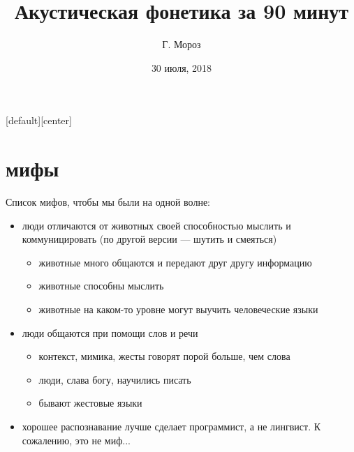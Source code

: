 
[default][center]
\title[]{Акустическая фонетика за 90 минут}
\author[]{Г. Мороз}
\date{30 июля, 2018}

\frame{\titlepage}
\section{мифы}
\begin{frame}{Список мифов, чтобы мы были на одной волне:}
\begin{itemize}
\item люди отличаются от животных своей способностью мыслить и коммуницировать (по другой версии --- шутить и смеяться) \pause
\begin{itemize}
\item животные много общаются и передают друг другу информацию \pause
\item животные способны мыслить \pause
\item животные на каком-то уровне могут выучить человеческие языки \pause
\end{itemize}
\item люди общаются при помощи слов и речи \pause
\begin{itemize}
\item контекст, мимика, жесты говорят порой больше, чем слова \pause
\item люди, слава богу, научились писать \pause
\item бывают жестовые языки
\end{itemize}
\item хорошее распознавание лучше сделает программист, а не лингвист\pause . К сожалению, это не миф...
\end{itemize}
\end{frame}
